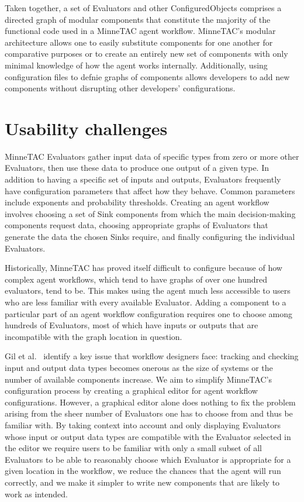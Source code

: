 \documentclass{elsart}
\begin{document}
Taken together, a set of Evaluators and other ConfiguredObjects comprises
a directed graph of modular components that constitute the majority
of the functional code used in a MinneTAC agent workflow.  MinneTAC's
modular architecture allows one to easily substitute components for one
another for comparative purposes or to create an entirely new set of
components with only minimal knowledge of how the agent works internally.
Additionally, using configuration files to defnie graphs of components
allows developers to add new components without disrupting other
developers' configurations.

\section{Usability challenges}

MinneTAC Evaluators gather input data of specific types from zero or
more other Evaluators, then use these data to produce one output of a
given type.  In addition to having a specific set of inputs and outputs,
Evaluators frequently have configuration parameters that affect how they
behave.  Common parameters include exponents and probability thresholds.
Creating an agent workflow involves choosing a set of Sink components
from which the main decision-making components request data, choosing
appropriate graphs of Evaluators that generate the data the chosen Sinks
require, and finally configuring the individual Evaluators.~\cite{Collins08TR}

Historically, MinneTAC has proved itself difficult to configure because of
how complex agent workflows, which tend to have graphs of over one hundred
evaluators, tend to be.  This makes using the agent much less accessible
to users who are less familiar with every available Evaluator.  Adding a
component to a particular part of an agent workflow configuration requires
one to choose among hundreds of Evaluators, most of which have inputs
or outputs that are incompatible with the graph location in question.

Gil et al.~\cite{gil2010wings} identify a key issue that workflow
designers face: tracking and checking input and output data types
becomes onerous as the size of systems or the number of available
components increase.  We aim to simplify MinneTAC's configuration
process by creating a graphical editor for agent workflow configurations.
However, a graphical editor alone does nothing to fix the problem arising
from the sheer number of Evaluators one has to choose from and thus
be familiar with.  By taking context into account and only displaying
Evaluators whose input or output data types are compatible with the
Evaluator selected in the editor we require users to be familiar with
only a small subset of all Evaluators to be able to reasonably choose
which Evaluator is appropriate for a given location in the workflow,
we reduce the chances that the agent will run correctly, and we make it
simpler to write new components that are likely to work as intended.
\end{document}
